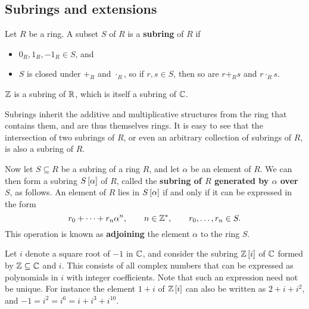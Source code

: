 \pagebreak

\subsection{Subrings and extensions}

\begin{definition}
Let $ R $ be a ring. A subset $ S $ of $ R $ is a \textbf{subring} of $ R $ if
\begin{itemize}
\item $ 0_R, 1_R, -1_R \in S $, and
\item $ S $ is closed under $ +_R $ and $ \cdot_R $, so if $ r, s \in S $, then so are $ r +_R s $ and $ r \cdot_R s $.
\end{itemize}
\end{definition}

\begin{example*}
$ \Z $ is a subring of $ \R $, which is itself a subring of $ \C $.
\end{example*}

Subrings inherit the additive and multiplicative structures from the ring that contains them, and are thus themselves rings. It is easy to see that the intersection of two subrings of $ R $, or even an arbitrary collection of subrings of $ R $, is also a subring of $ R $.

\begin{definition}
Now let $ S \subseteq R $ be a subring of a ring $ R $, and let $ \alpha $ be an element of $ R $. We can then form a subring $ S\sb{\alpha} $ of $ R $, called the \textbf{subring of $ R $ generated by $ \alpha $ over $ S $}, as follows. An element of $ R $ lies in $ S\sb{\alpha} $ if and only if it can be expressed in the form
$$ r_0 + \dots + r_n\alpha^n, \qquad n \in \Z^*, \qquad r_0, \dots, r_n \in S. $$
This operation is known as \textbf{adjoining} the element $ \alpha $ to the ring $ S $.
\end{definition}

\begin{example*}
Let $ i $ denote a square root of $ -1 $ in $ \C $, and consider the subring $ \Z\sb{i} $ of $ \C $ formed by $ \Z \subseteq \C $ and $ i $. This consists of all complex numbers that can be expressed as polynomials in $ i $ with integer coefficients. Note that such an expression need not be unique. For instance the element $ 1 + i $ of $ \Z\sb{i} $ can also be written as $ 2 + i + i^2 $, and $ -1 = i^2 = i^6 = i + i^3 + i^{10} $.
\end{example*}

